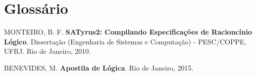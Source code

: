 \documentclass[12pt]{satyrus}
\begin{document}
    \chapter*{Glossário}
    
    \begin{thebibliography}{20}
    	 MONTEIRO, B. F. \textbf{SATyrus2: Compilando Especificações de Racioncínio Lógico}. Dissertação (Engenharia de Sistemas e Computação) - PESC/COPPE, UFRJ. Rio de Janeiro, 2010.
    	
    	 BENEVIDES, M. \textbf{Apostila de Lógica}. Rio de Janeiro, 2015.
    \end{thebibliography}
    
\end{document}
